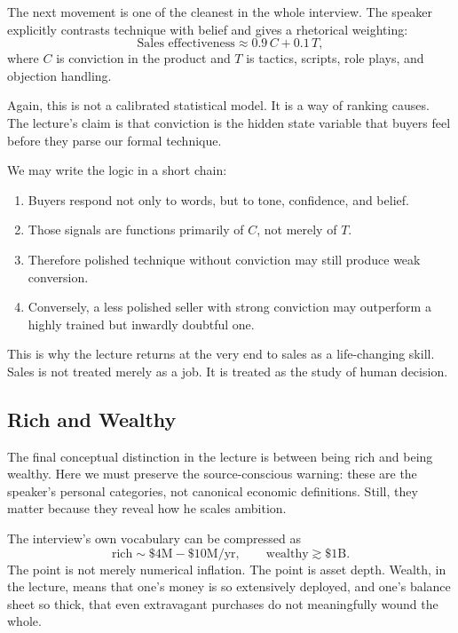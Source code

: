 The next movement is one of the cleanest in the whole interview. The speaker explicitly contrasts technique with belief and gives a rhetorical weighting:
\begin{equation}
\text{Sales effectiveness} \approx 0.9\,C + 0.1\,T,
\end{equation}
where \(C\) is conviction in the product and \(T\) is tactics, scripts, role plays, and objection handling.

Again, this is not a calibrated statistical model. It is a way of ranking causes. The lecture's claim is that conviction is the hidden state variable that buyers feel before they parse our formal technique.

We may write the logic in a short chain:
\begin{enumerate}
\item Buyers respond not only to words, but to tone, confidence, and belief.
\item Those signals are functions primarily of \(C\), not merely of \(T\).
\item Therefore polished technique without conviction may still produce weak conversion.
\item Conversely, a less polished seller with strong conviction may outperform a highly trained but inwardly doubtful one.
\end{enumerate}

This is why the lecture returns at the very end to sales as a life-changing skill. Sales is not treated merely as a job. It is treated as the study of human decision.

\subsection{Rich and Wealthy}

The final conceptual distinction in the lecture is between being rich and being wealthy. Here we must preserve the source-conscious warning: these are the speaker's personal categories, not canonical economic definitions. Still, they matter because they reveal how he scales ambition.

The interview's own vocabulary can be compressed as
\begin{equation}
\text{rich}\sim \$4\text{M}-\$10\text{M}/\text{yr},\qquad \text{wealthy}\gtrsim \$1\text{B}.
\end{equation}
The point is not merely numerical inflation. The point is asset depth. Wealth, in the lecture, means that one's money is so extensively deployed, and one's balance sheet so thick, that even extravagant purchases do not meaningfully wound the whole.

